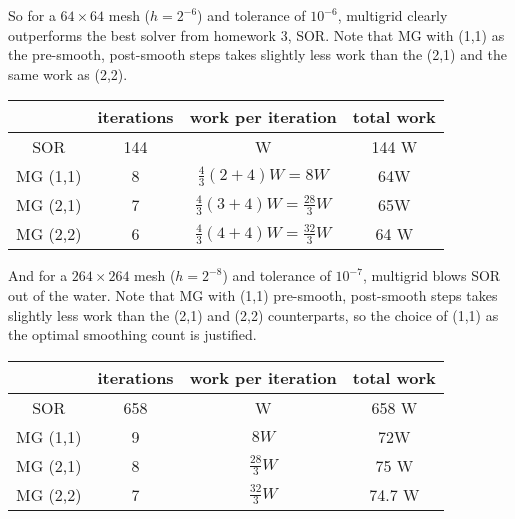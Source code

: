 \documentclass[12pt]{article}
\begin{document}
So for a $64\times64$ mesh ($h=2^{-6}$) and tolerance of $10^{-6}$, multigrid clearly outperforms the best solver from homework 3, SOR.  Note that MG with (1,1) as the pre-smooth, post-smooth steps takes slightly less work than the (2,1) and the same work as (2,2).
\begin{center}
\begin{tabular}{||c|c|c|c||}
\hline \hline
 & iterations & work per iteration & total work \\
\hline \hline
SOR & 144 & W & 144 W \\
MG (1,1) & 8 & $\frac{4}{3}(2+4)W = 8W$ & 64W \\
MG (2,1) & 7 & $\frac{4}{3}(3+4)W = \frac{28}{3}W$ & 65W \\
MG (2,2) & 6 & $\frac{4}{3}(4+4)W = \frac{32}{3}W$ & 64 W\\
\hline \hline
\end{tabular}
\end{center}

And for a $264\times264$ mesh ($h=2^{-8}$) and tolerance of $10^{-7}$, multigrid blows SOR out of the water. Note that MG with (1,1) pre-smooth, post-smooth steps takes slightly less work than the (2,1) and (2,2) counterparts, so the choice of (1,1) as the optimal smoothing count is justified.
\begin{center}
\begin{tabular}{||c|c|c|c||}
\hline \hline
 & iterations & work per iteration & total work \\
\hline \hline
SOR & 658 & W & 658 W \\
MG (1,1) & 9 & $8W$ & 72W \\
MG (2,1) & 8 & $\frac{28}{3}W$ & 75 W \\
MG (2,2) & 7 & $\frac{32}{3}W$ & 74.7 W\\
\hline \hline
\end{tabular}
\end{center}
\end{document}
